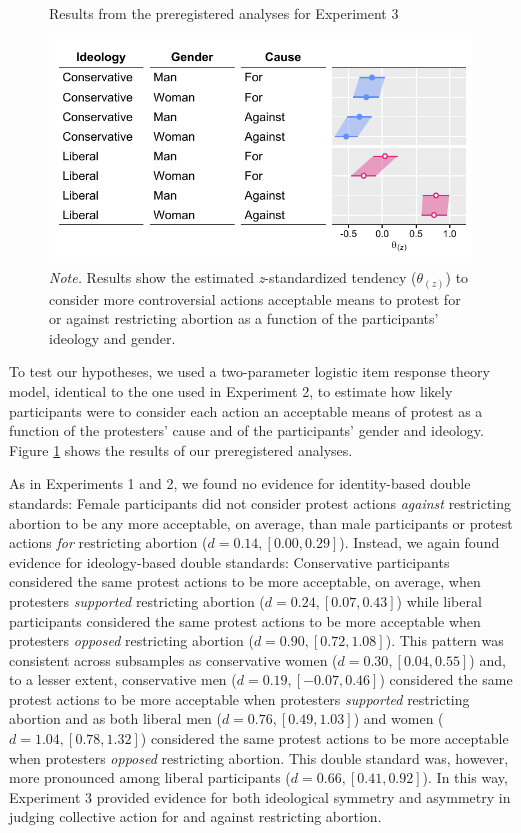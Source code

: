 \documentclass[twocolumn, 11pt, letterpaper]{article}
\begin{document}
\begin{figure}[!t]
\centering
\caption{Results from the preregistered analyses for Experiment 3}
\includegraphics[scale=1]{../Experiment 3/figures/figure-6}
\caption*{\textit{Note.} Results show the estimated \textit{z}-standardized tendency ($\theta_{(z)}$) to consider more controversial actions acceptable means to protest for or against restricting abortion as a function of the participants' ideology and gender.}
\label{fig:f6}
\end{figure}

To test our hypotheses, we used a two-parameter logistic item response
theory model, identical to the one used in Experiment 2, to estimate how
likely participants were to consider each action an acceptable means of
protest as a function of the protesters' cause and of the participants'
gender and ideology. Figure \ref{fig:f6} shows the results of our
preregistered analyses.

As in Experiments 1 and 2, we found no evidence for identity-based
double standards: Female participants did not consider protest actions
\emph{against} restricting abortion to be any more acceptable, on
average, than male participants or protest actions \emph{for}
restricting abortion (\(d = 0.14, [0.00, 0.29]\)). Instead, we again
found evidence for ideology-based double standards: Conservative
participants considered the same protest actions to be more acceptable,
on average, when protesters \emph{supported} restricting abortion
(\(d = 0.24, [0.07, 0.43]\)) while liberal participants considered the
same protest actions to be more acceptable when protesters
\emph{opposed} restricting abortion (\(d = 0.90, [0.72, 1.08]\)). This
pattern was consistent across subsamples as conservative women
(\(d = 0.30, [0.04, 0.55]\)) and, to a lesser extent, conservative men
(\(d = 0.19, [-0.07, 0.46]\)) considered the same protest actions to be
more acceptable when protesters \emph{supported} restricting abortion
and as both liberal men (\(d = 0.76, [0.49, 1.03]\)) and women
(\(d = 1.04, [0.78, 1.32]\)) considered the same protest actions to be
more acceptable when protesters \emph{opposed} restricting abortion.
This double standard was, however, more pronounced among liberal
participants (\(d = 0.66, [0.41, 0.92]\)). In this way, Experiment 3
provided evidence for both ideological symmetry and asymmetry in judging
collective action for and against restricting abortion.
\end{document}
